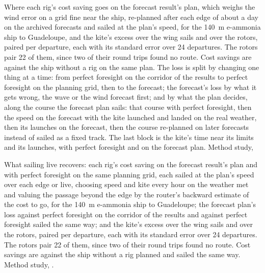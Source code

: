 \begin{table}[tbp]
\centering
\footnotesize
\caption{Where each rig's cost saving goes on the forecast result's plan, which weighs the wind error on a grid fine near the ship, re-planned after each edge of about a day on the archived forecasts and sailed at the plan's speed, for the \SI{140}{m} e-ammonia ship to Guadeloupe, and the kite's excess over the wing sails and over the rotors, paired per departure, each with its standard error over 24 departures. The rotors pair 22 of them, since two of their round trips found no route. Cost savings are against the ship without a rig on the same plan. The loss is split by changing one thing at a time: from perfect foresight on the corridor of the results to perfect foresight on the planning grid, then to the forecast; the forecast's loss by what it gets wrong, the wave or the wind forecast first; and by what the plan decides, along the course the forecast plan sails: that course with perfect foresight, then the speed on the forecast with the kite launched and landed on the real weather, then its launches on the forecast, then the course re-planned on later forecasts instead of sailed as a fixed track. The last block is the kite's time near its limits and its launches, with perfect foresight and on the forecast plan. Method study,  }
\label{tab:forecast_causes}

\end{table}

\begin{table}[tbp]
\centering
\footnotesize
\caption{What sailing live recovers: each rig's cost saving on the forecast result's plan and with perfect foresight on the same planning grid, each sailed at the plan's speed over each edge or live, choosing speed and kite every hour on the weather met and valuing the passage beyond the edge by the router's backward estimate of the cost to go, for the \SI{140}{m} e-ammonia ship to Guadeloupe; the forecast plan's loss against perfect foresight on the corridor of the results and against perfect foresight sailed the same way; and the kite's excess over the wing sails and over the rotors, paired per departure, each with its standard error over 24 departures. The rotors pair 22 of them, since two of their round trips found no route. Cost savings are against the ship without a rig planned and sailed the same way. Method study, . }
\label{tab:forecast_live}

\end{table}

